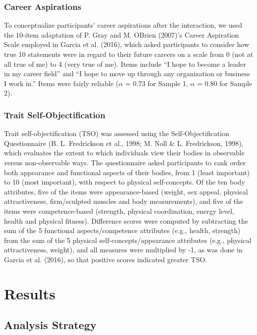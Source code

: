 \documentclass[man]{apa6}
\begin{document}
\subsubsection{Career Aspirations}\label{career-aspirations}

To conceptualize participants' career aspirations after the interaction,
we used the 10-item adaptation of P. Gray and M. OBrien (2007)'s Career
Aspiration Scale employed in Garcia et al. (2016), which asked
participants to consider how true 10 statements were in regard to their
future careers on a scale from 0 (not at all true of me) to 4 (very true
of me). Items include \enquote{I hope to become a leader in my career
field} and \enquote{I hope to move up through any organization or
business I work in.} Items were fairly reliable (\(\alpha\) = 0.73 for
Sample 1, \(\alpha\) = 0.80 for Sample 2).

\subsubsection{Trait
Self-Objectification}\label{trait-self-objectification}

Trait self-objectification (TSO) was assessed using the
Self-Objectification Questionnaire (B. L. Fredrickson et al., 1998; M.
Noll \& L. Fredrickson, 1998), which evaluates the extent to which
individuals view their bodies in observable versus non-observable ways.
The questionnaire asked participants to rank order both appearance and
functional aspects of their bodies, from 1 (least important) to 10 (most
important), with respect to physical self-concepts. Of the ten body
attributes, five of the items were appearance-based (weight, sex appeal,
physical attractiveness, firm/sculpted muscles and body measurements),
and five of the items were competence-based (strength, physical
coordination, energy level, health and physical fitness). Difference
scores were computed by subtracting the sum of the 5 functional
aspects/competence attributes (e.g., health, strength) from the sum of
the 5 physical self-concepts/appearance attributes (e.g., physical
attractiveness, weight), and all measures were multiplied by -1, as was
done in Garcia et al. (2016), so that positive scores indicated greater
TSO.

\section{Results}\label{results}

\subsection{Analysis Strategy}\label{analysis-strategy}
\end{document}

